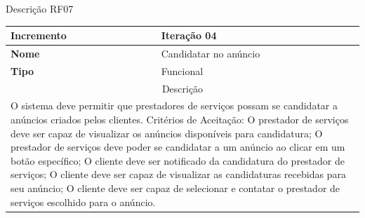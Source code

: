 \clearpage
\begin{quadro}[htb]
	\centering
	\caption{\label{Formatação do texto.}Descrição RF07}	
	\begin{tabular}{|l|p{11cm}|}
		\hline
		\textbf{Incremento}    & Iteração 04\\ \hline
		\textbf{Nome}    & Candidatar no anúncio\\ \hline
		\textbf{Tipo}    & Funcional\\ \hline
		\multicolumn{2}{|c|}{Descrição}\\ \hline
		\multicolumn{2}{|p{12cm}|}{
			O sistema deve permitir que prestadores de serviços possam se candidatar a anúncios criados pelos clientes. \newline
			\newline Critérios de Aceitação: \newline
			O prestador de serviços deve ser capaz de visualizar os anúncios disponíveis para candidatura; \newline
            O prestador de serviços deve poder se candidatar a um anúncio ao clicar em um botão específico; \newline
			O cliente deve ser notificado da candidatura do prestador de serviços; \newline
			O cliente deve ser capaz de visualizar as candidaturas recebidas para seu anúncio; \newline
			O cliente deve ser capaz de selecionar e contatar o prestador de serviços escolhido para o anúncio.
			} \\ \hline
	\end{tabular}
\end{quadro}


